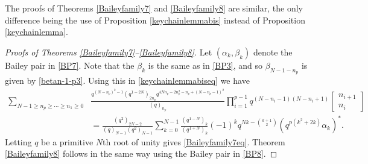 \documentclass[11pt,reqno]{amsart}
\theoremstyle{definition}
\numberwithin{equation}{section}
\renewcommand{\=}{\;=\;}
\begin{document}
The proofs of Theorems \ref{Baileyfamily7} and \ref{Baileyfamily8} are similar, the only difference being the use of Proposition \ref{keychainlemmabis} instead of Proposition \ref{keychainlemma}.   


\begin{proof}[Proofs of Theorems \ref{Baileyfamily7}--\ref{Baileyfamily8}]
Let $(\alpha_k,\beta_k)$ denote the Bailey pair in \eqref{BP7}.   Note that the $\beta_k$ is the same as in \eqref{BP3}, and so $\beta_{N-1-n_p}$ is given by \eqref{betan-1-p3}.   Using this in \eqref{keychainlemmabiseq} we have
\begin{equation}
\begin{aligned}
\sum_{N-1 \geq n_p \geq \cdots \geq n_1\geq 0}& \frac{q^{(N-n_p)^2-1} (q^{1-2N})_{2n_p} q^{4Nn_p-2n_p^2-n_p + (N-n_p-1)^2}}{(q)_{n_p}} \prod_{i=1}^{p-1} q^{(N-n_i-1)(N-n_i+1)} \begin{bmatrix} n_{i+1} \\ n_i \end{bmatrix} \\
&= \frac{(q^2)_{2N-2}}{(q)_{N-1}(q^2)_{N-1}} \sum_{k=0}^{N-1} \frac{(q^{1-N})_k}{(q^{1+N})_k}(-1)^k q^{Nk -\binom{k+1}{2}} (q^{p(k^2+2k)} \alpha_k)^*.
\end{aligned}
\end{equation} 	
Letting $q$ be a primitive $N$th root of unity gives \eqref{Baileyfamily7eq}.   Theorem \ref{Baileyfamily8} follows in the same way using the Bailey pair in \eqref{BP8}.
\end{proof}
\end{document}
